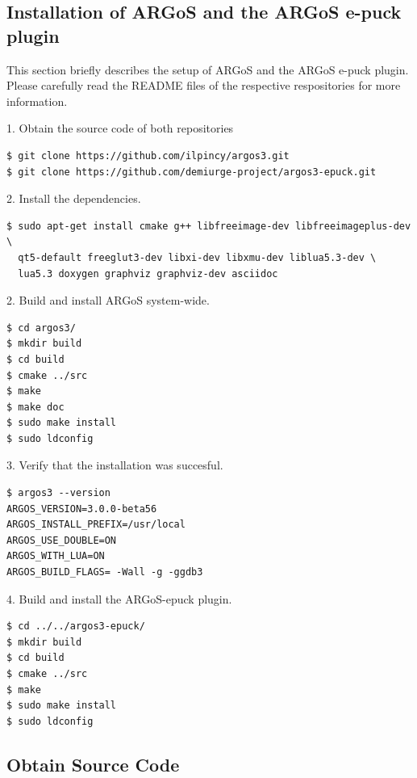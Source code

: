 \documentclass{article}
\begin{document}
 \subsection{Installation of ARGoS and the ARGoS e-puck plugin}

This section briefly describes the setup of ARGoS and the ARGoS e-puck
plugin. Please carefully read the README files of the respective
respositories for more information.

1. Obtain the source code of both repositories

\begin{verbatim}
$ git clone https://github.com/ilpincy/argos3.git
$ git clone https://github.com/demiurge-project/argos3-epuck.git
\end{verbatim}

2. Install the dependencies.

\begin{verbatim}
$ sudo apt-get install cmake g++ libfreeimage-dev libfreeimageplus-dev \
  qt5-default freeglut3-dev libxi-dev libxmu-dev liblua5.3-dev \
  lua5.3 doxygen graphviz graphviz-dev asciidoc
\end{verbatim}

2. Build and install ARGoS system-wide.
\begin{verbatim}
$ cd argos3/
$ mkdir build
$ cd build
$ cmake ../src
$ make
$ make doc
$ sudo make install
$ sudo ldconfig
\end{verbatim}

3. Verify that the installation was succesful.

\begin{verbatim}
$ argos3 --version
ARGOS_VERSION=3.0.0-beta56
ARGOS_INSTALL_PREFIX=/usr/local
ARGOS_USE_DOUBLE=ON
ARGOS_WITH_LUA=ON
ARGOS_BUILD_FLAGS= -Wall -g -ggdb3
\end{verbatim}

4. Build and install the ARGoS-epuck plugin.

\begin{verbatim}
$ cd ../../argos3-epuck/
$ mkdir build
$ cd build
$ cmake ../src
$ make
$ sudo make install
$ sudo ldconfig
\end{verbatim}

\subsection{Obtain Source Code}
\end{document}
